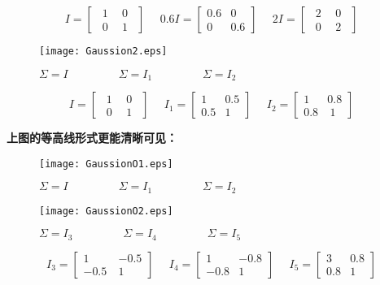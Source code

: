 $$I=\begin{bmatrix}
      ~~1~ & ~0~~ \\
      ~~0~ & ~1~~
    \end{bmatrix}~~~~~~0.6I=\begin{bmatrix}
                      0.6 & 0 \\
                      0 & 0.6
                    \end{bmatrix}~~~~~~2I=\begin{bmatrix}
                                           ~~ 2~ & ~0~~ \\
                                           ~~ 0~ & ~2~~
                                          \end{bmatrix}$$

\begin{figure}[!h]
  \centering
  \texttt{[image: Gaussion2.eps]}
  \caption{$\Sigma=I~~~~~~~~~~~~~~~~~~~~\Sigma=I_1~~~~~~~~~~~~~~~~~~~~\Sigma=I_2$}
\end{figure}
$$I=\begin{bmatrix}
      ~~1~ & ~0~~ \\
      ~~0~ & ~1~~
    \end{bmatrix}~~~~~~I_1=\begin{bmatrix}
                      1 & 0.5 \\
                      0.5 & 1
                    \end{bmatrix}~~~~~~I_2=\begin{bmatrix}
                                            1 & 0.8 \\
                                            0.8 & ~1
                                          \end{bmatrix}$$

\newpage
\noindent\textbf{上图的等高线形式更能清晰可见：}
\begin{figure}[!h]
  \centering
  \texttt{[image: GaussionO1.eps]}
  \caption{$\Sigma=I~~~~~~~~~~~~~~~~~~~~\Sigma=I_1~~~~~~~~~~~~~~~~~~~~\Sigma=I_2$}
\end{figure}

\begin{figure}[!h]
  \centering
  \texttt{[image: GaussionO2.eps]}
  \caption{$\Sigma=I_3~~~~~~~~~~~~~~~~~~~~\Sigma=I_4~~~~~~~~~~~~~~~~~~~~\Sigma=I_5$}
\end{figure}
$$I_3=\begin{bmatrix}
      1 & -0.5 \\
      -0.5~ & 1
    \end{bmatrix}~~~~~~I_4=\begin{bmatrix}
                      1 & -0.8 \\
                      -0.8 & 1
                    \end{bmatrix}~~~~~~I_5=\begin{bmatrix}
                                            3 & 0.8 \\
                                            0.8 & 1
                                          \end{bmatrix}$$


